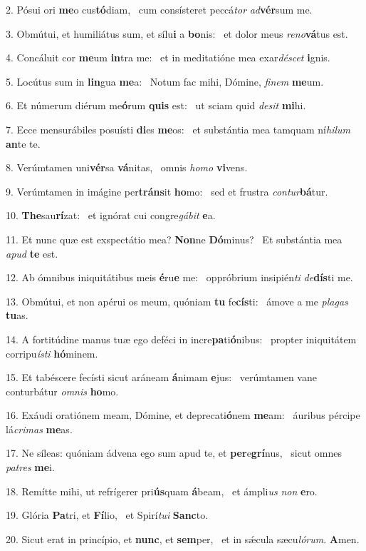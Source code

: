 2. Pósui ori \textbf{me}o cus\textbf{tó}diam, \ast\  cum consísteret peccá\textit{tor} \textit{ad}\textbf{vér}sum me.\

3. Obmútui, et humiliátus sum, et sílu\textbf{i} a \textbf{bo}nis: \ast\  et dolor meus \textit{re}\textit{no}\textbf{vá}tus est.\

4. Concáluit cor \textbf{me}um \textbf{in}tra me: \ast\  et in meditatióne mea exar\textit{dé}\textit{scet} \textbf{i}gnis.\

5. Locútus sum in \textbf{lin}gua \textbf{me}a: \ast\  Notum fac mihi, Dómine, \textit{fi}\textit{nem} \textbf{me}um.\

6. Et númerum diérum me\textbf{ó}rum \textbf{quis} est: \ast\  ut sciam quid \textit{de}\textit{sit} \textbf{mi}hi.\

7. Ecce mensurábiles posuísti \textbf{di}es \textbf{me}os: \ast\  et substántia mea tamquam ní\textit{hi}\textit{lum} \textbf{an}te te.\

8. Verúmtamen uni\textbf{vér}sa \textbf{vá}nitas, \ast\  omnis \textit{ho}\textit{mo} \textbf{vi}vens.\

9. Verúmtamen in imágine per\textbf{tráns}it \textbf{ho}mo: \ast\  sed et frustra \textit{con}\textit{tur}\textbf{bá}tur.\

10. \textbf{The}sau\textbf{rí}zat: \ast\  et ignórat cui congre\textit{gá}\textit{bit} \textbf{e}a.\

11. Et nunc quæ est exspectátio mea? \textbf{Non}ne \textbf{Dó}minus? \ast\  Et substántia mea \textit{a}\textit{pud} \textbf{te} est.\

12. Ab ómnibus iniquitátibus meis \textbf{é}ru\textbf{e} me: \ast\  oppróbrium insipién\textit{ti} \textit{de}\textbf{dís}ti me.\

13. Obmútui, et non apérui os meum, quóniam \textbf{tu} fe\textbf{cís}ti: \ast\  ámove a me \textit{pla}\textit{gas} \textbf{tu}as.\

14. A fortitúdine manus tuæ ego deféci in incre\textbf{pa}ti\textbf{ó}nibus: \ast\  propter iniquitátem corripu\textit{ís}\textit{ti} \textbf{hó}minem.\

15. Et tabéscere fecísti sicut aráneam \textbf{á}nimam \textbf{e}jus: \ast\  verúmtamen vane conturbátur \textit{om}\textit{nis} \textbf{ho}mo.\

16. Exáudi oratiónem meam, Dómine, et deprecati\textbf{ó}nem \textbf{me}am: \ast\  áuribus pércipe lá\textit{cri}\textit{mas} \textbf{me}as.\

17. Ne síleas: quóniam ádvena ego sum apud te, et \textbf{per}e\textbf{grí}nus, \ast\  sicut omnes \textit{pa}\textit{tres} \textbf{me}i.\

18. Remítte mihi, ut refrígerer pri\textbf{ús}quam \textbf{á}beam, \ast\  et ámpli\textit{us} \textit{non} \textbf{e}ro.\

19. Glória \textbf{Pa}tri, et \textbf{Fí}lio, \ast\  et Spirí\textit{tu}\textit{i} \textbf{Sanc}to.\

20. Sicut erat in princípio, et \textbf{nunc}, et \textbf{sem}per, \ast\  et in sǽcula sæcu\textit{ló}\textit{rum}. \textbf{A}men.\

